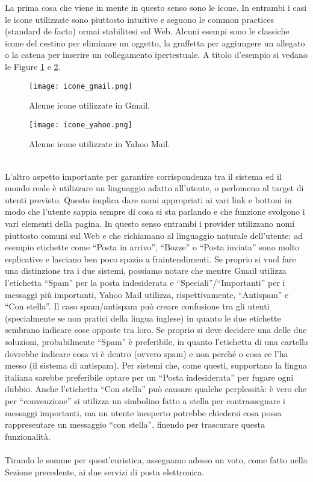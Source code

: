 		La prima cosa che viene in mente in questo senso sono le icone. In entrambi i casi le icone utilizzate sono piuttosto intuitive e seguono le common practices (standard de facto) ormai stabilitesi sul Web. Alcuni esempi sono le classiche icone del cestino per eliminare un oggetto, la graffetta per aggiungere un allegato o la catena per inserire un collegamento ipertestuale. A titolo d'esempio si vedano le Figure \ref{fig:icone_gmail} e \ref{fig:icone_yahoo}.
		\begin{figure}[h!]
			\begin{center}
				\texttt{[image: icone\_gmail.png]}
			\end{center}
			\caption[Icone di Gmail]{Alcune icone utilizzate in Gmail.}
			\label{fig:icone_gmail}
		\end{figure}
		\begin{figure}[h!]
			\begin{center}
				\texttt{[image: icone\_yahoo.png]}
			\end{center}
			\caption[Icone di Yahoo Mail]{Alcune icone utilizzate in Yahoo Mail.}
			\label{fig:icone_yahoo}
		\end{figure}
		\\
		
		L'altro aspetto importante per garantire corrispondenza tra il sistema ed il mondo reale è utilizzare un linguaggio adatto all'utente, o perlomeno al target di utenti previsto. Questo implica dare nomi appropriati ai vari link e bottoni in modo che l'utente sappia sempre di cosa si sta parlando e che funzione svolgono i vari elementi della pagina. In questo senso entrambi i provider utilizzano nomi piuttosto comuni sul Web e che richiamano al linguaggio naturale dell'utente: ad esempio etichette come ``Posta in arrivo'', ``Bozze'' o ``Posta inviata'' sono molto esplicative e lasciano ben poco spazio a fraintendimenti. Se proprio si vuol fare una distinzione tra i due sistemi, possiamo notare che mentre Gmail utilizza l'etichetta ``Spam'' per la posta indesiderata e ``Speciali''/``Importanti'' per i messaggi più importanti, Yahoo Mail utilizza, rispettivamente, ``Antispam'' e ``Con stella''. Il caso spam/antispam può creare confusione tra gli utenti (specialmente se non pratici della lingua inglese) in quanto le due etichette sembrano indicare cose opposte tra loro. Se proprio si deve decidere una delle due soluzioni, probabilmente ``Spam'' è preferibile, in quanto l'etichetta di una cartella dovrebbe indicare cosa vi è dentro (ovvero spam) e non perché o cosa ce l'ha messo (il sistema di antispam). Per sistemi che, come questi, supportano la lingua italiana sarebbe preferibile optare per un ``Posta indesiderata'' per fugare ogni dubbio. Anche l'etichetta ``Con stella'' può causare qualche perplessità: è vero che per ``convenzione'' si utilizza un simbolino fatto a stella per contrassegnare i messaggi importanti, ma un utente inesperto potrebbe chiedersi cosa possa rappresentare un messaggio ``con stella'', finendo per trascurare questa funzionalità.\\
		\\
		Tirando le somme per quest'euristica, assegnamo adesso un voto, come fatto nella Sezione precedente, ai due servizi di posta elettronica.
		
